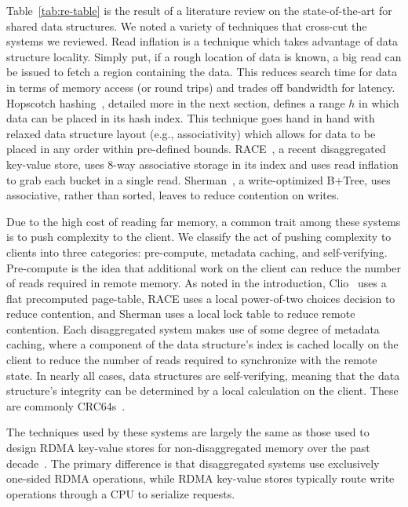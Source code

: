 \documentclass[12pt]{ucsddissertation}
\begin{document}
Table~\ref{tab:re-table} is the result of a literature review on the state-of-the-art for shared
data structures. We noted a variety of techniques that cross-cut the systems we reviewed. Read
inflation is a technique which takes advantage of data structure locality. Simply put, if a rough
location of data is known, a big read can be issued to fetch a region containing the data. This
reduces search time for data in terms of memory access (or round trips) and trades off bandwidth for
latency. Hopscotch hashing~\cite{hopscotch}, detailed more in the next section, defines a range $h$
in which data can be placed in its hash index. This technique goes hand in hand with relaxed data
structure layout (e.g., associativity) which allows for data to be placed in any order within
pre-defined bounds. RACE~\cite{race}, a recent disaggregated key-value store, uses 8-way associative
storage in its index and uses read inflation to grab each bucket in a single read.
Sherman~\cite{sherman}, a write-optimized B+Tree, uses associative, rather than sorted, leaves to
reduce contention on writes.

Due to the high cost of reading far memory, a common trait among these systems is to push complexity
to the client. We classify the act of pushing complexity to clients into three categories:
pre-compute, metadata caching, and self-verifying. Pre-compute is the idea that additional work on
the client can reduce the number of reads required in remote memory. As noted in the introduction,
Clio~\cite{clio} uses a flat precomputed page-table, RACE uses a local power-of-two choices decision
to reduce contention, and Sherman uses a local lock table to reduce remote contention. Each
disaggregated system makes use of some degree of metadata caching, where a component of the data
structure's index is cached locally on the client to reduce the number of reads required to
synchronize with the remote state. In nearly all cases, data structures are self-verifying, meaning
that the data structure's integrity can be determined by a local calculation on the client. These
are commonly CRC64s~\cite{pilaf,cell,fusee,race}.

The techniques used by these systems are largely the same as those used to design RDMA key-value
stores for non-disaggregated memory over the past decade~\cite{farm,herd,pilaf,cell}. The primary
difference is that disaggregated systems use exclusively one-sided RDMA operations, while RDMA
key-value stores typically route write operations through a CPU to serialize requests.
\end{document}
